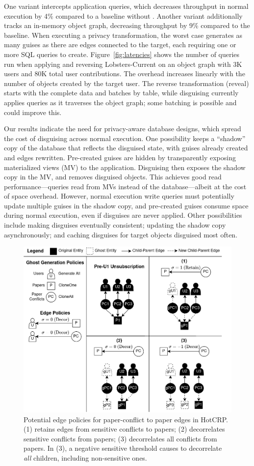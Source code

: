 One \sys variant intercepts application queries, which decreases throughput in normal execution by
4\% compared to a baseline without \sys.
%
Another variant additionally tracks an in-memory object graph, decreasing throughput by 9\% compared
to the baseline.
%
When executing a privacy transformation, the worst case generates as many guises as there are
edges connected to the target, each requiring one or more SQL queries to create.
%
Figure~\ref{fig:latencies} shows the number of queries run when applying and reversing
Lobsters-Current on an object graph with 3K users and 80K total user contributions.
%
The overhead increases linearly with the number of objects created by the target user.
%
The reverse transformation (reveal) starts with the complete data and batches by table,
while disguising currently applies queries as it traverses the object graph; some batching
is possible and could improve this.
%

%
Our results indicate the need for privacy-aware database designs, which spread the cost of
disguising across normal execution.
%
One possibility keeps a ``shadow'' copy of the database that reflects the disguised state, with
guises already created and edges rewritten.
%
Pre-created guises are hidden by transparently exposing materialized views (MV) to the
application.
%
Disguising then exposes the shadow copy in the MV, and removes disguised objects.
%
This achieves good read performance---queries read from MVs instead of the database---albeit
at the cost of space overhead.
%
However, normal execution write queries must potentially update multiple guises in the
shadow copy, and pre-created guises consume space during normal execution, even if disguises
are never applied.
%
Other possibilities include making disguises eventually consistent; updating the shadow copy
asynchronously; and caching disguises for target objects disguised most often.

\iffalse
\begin{figure}[t!]
    \centering
    \includegraphics[width=.5\textwidth]{img/pcs}

    \caption{Potential edge policies for paper-conflict to paper edges in HotCRP.
    (1) retains edges from sensitive conflicts to papers; (2) decorrelates sensitive
    conflicts from papers; (3) decorrelates all conflicts from papers.
    In (3), a negative sensitive threshold causes \sys to
decorrelate \emph{all} children, including non-sensitive ones.}
    \label{fig:pcs}
\end{figure}

